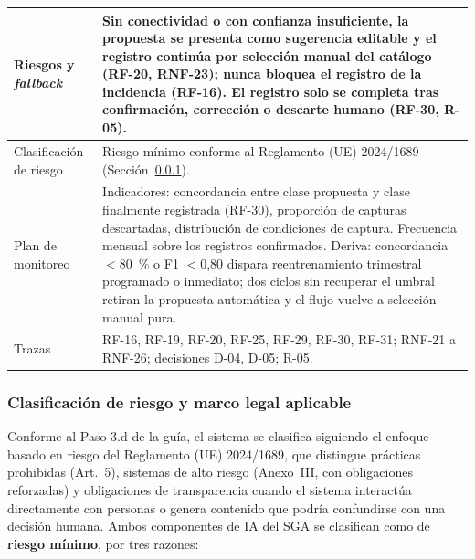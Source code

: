 \documentclass[12pt,a4paper]{article}
\begin{document}
\begin{center}
\begin{longtable}{|p{4.2cm}|p{10cm}|}
\hline
Riesgos y \emph{fallback} & Sin conectividad o con confianza insuficiente, la propuesta se presenta como sugerencia editable y el registro continúa por selección manual del catálogo (RF-20, RNF-23); nunca bloquea el registro de la incidencia (RF-16). El registro solo se completa tras confirmación, corrección o descarte humano (RF-30, R-05). \\
\hline
Clasificación de riesgo & Riesgo mínimo conforme al Reglamento (UE) 2024/1689 (Sección~\ref{sec:riesgo-ia}). \\
\hline
Plan de monitoreo & Indicadores: concordancia entre clase propuesta y clase finalmente registrada (RF-30), proporción de capturas descartadas, distribución de condiciones de captura. Frecuencia mensual sobre los registros confirmados. Deriva: concordancia $<$80~\% o F1 $<$0,80 dispara reentrenamiento trimestral programado o inmediato; dos ciclos sin recuperar el umbral retiran la propuesta automática y el flujo vuelve a selección manual pura. \\
\hline
Trazas & RF-16, RF-19, RF-20, RF-25, RF-29, RF-30, RF-31; RNF-21 a RNF-26; decisiones D-04, D-05; R-05. \\
\hline
\end{longtable}
\end{center}

\subsubsection{Clasificación de riesgo y marco legal aplicable}
\label{sec:riesgo-ia}

Conforme al Paso 3.d de la guía, el sistema se clasifica siguiendo el enfoque basado en riesgo del Reglamento (UE) 2024/1689, que distingue prácticas prohibidas (Art.~5), sistemas de alto riesgo (Anexo~III, con obligaciones reforzadas) y obligaciones de transparencia cuando el sistema interactúa directamente con personas o genera contenido que podría confundirse con una decisión humana. Ambos componentes de IA del SGA se clasifican como de \textbf{riesgo mínimo}, por tres razones:
\end{document}

